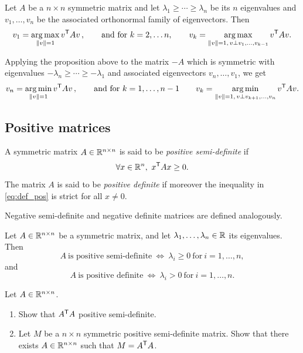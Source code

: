 \documentclass[11pt,nocut]{article}
\begin{document}
\begin{proposition}\label{prop:eigen_var}
	Let $A$ be a $n \times n$ symmetric matrix and let $\lambda_1 \geq \cdots \geq \lambda_n$ be its $n$ eigenvalues and $v_1, \dots, v_n$ be the associated orthonormal family of eigenvectors. Then 
	$$
	v_1 = \operatorname*{arg\,max}_{\|v\| = 1} v^{{\sf T}} A v\,,
	\qquad \text{and for} \ k=2, \dots n, \qquad
	v_{k} = \operatorname*{arg\,max}_{\|v\| = 1, \, v \perp v_1, \dots, v_{k-1}} v^{{\sf T}} A v.
	$$
\end{proposition}

\begin{remark} Applying the proposition above to the matrix $-A$ which is symmetric with eigenvalues $-\lambda_n \geq \cdots \geq -\lambda_1$ and associated eigenvectors $v_n, \dots, v_1$, we get
	$$
	v_n = \operatorname*{arg\,min}_{\|v\| = 1} v^{{\sf T}} A v\,,
	\qquad \text{and for} \ k=1, \dots , n-1 \qquad
	v_{k} = \operatorname*{arg\,min}_{\|v\| = 1, \, v \perp v_{k+1}, \dots, v_{n}} v^{{\sf T}} A v.
	$$
\end{remark}

\subsection*{Positive matrices}

\begin{definition}
	A symmetric matrix $A \in \mathbb{R}^{n \times n}$ is said to be \emph{positive semi-definite} if 
	\begin{equation}\label{eq:def_pos}
		\forall x \in \mathbb{R}^n, \ x^{{\sf T}} A x \geq 0.
	\end{equation}
	The matrix $A$ is said to be \emph{positive definite} if moreover the inequality in \eqref{eq:def_pos} is strict for all $x \neq 0$.
\end{definition}
\begin{remark}
	Negative semi-definite and negative definite matrices are defined analogously.
\end{remark}

\begin{proposition}
	Let $A \in \mathbb{R}^{n \times n}$ be a symmetric matrix, and let $\lambda_1, \dots,\lambda_n \in \mathbb{R}$ its eigenvalues. Then
	$$
	A \ \text{is positive semi-definite} \ \Longleftrightarrow \
	\lambda_i \geq 0 \ \text{for} \ i = 1, \dots, n,
	$$
	and
	$$
	A \ \text{is positive definite} \ \Longleftrightarrow \
	\lambda_i > 0 \ \text{for} \ i = 1, \dots, n.
	$$
\end{proposition}

\begin{exercise}
	Let $A \in \mathbb{R}^{n \times n}$.
	\begin{enumerate}[label=\alph*.]
		\item Show that $A^{{\sf T}} A$ positive semi-definite.
		\item Let $M$ be a $n \times n$ symmetric positive semi-definite matrix. Show that there exists $A \in \mathbb{R}^{n \times n}$ such that $M = A^{{\sf T}} A$.
	\end{enumerate}
\end{exercise}
\end{document}
